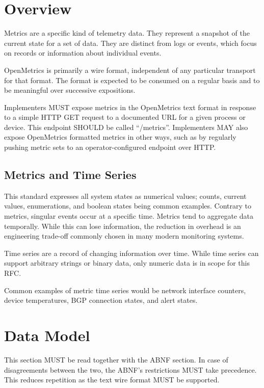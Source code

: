 \documentclass[a4paper,12pt,notitlepage,twoside,openright]{article}
\begin{document}
\hypertarget{overview}{%
\section{Overview}\label{overview}}

Metrics are a specific kind of telemetry data. They represent a snapshot
of the current state for a set of data. They are distinct from logs or
events, which focus on records or information about individual events.

OpenMetrics is primarily a wire format, independent of any particular
transport for that format. The format is expected to be consumed on a
regular basis and to be meaningful over successive expositions.

Implementers MUST expose metrics in the OpenMetrics text format in
response to a simple HTTP GET request to a documented URL for a given
process or device. This endpoint SHOULD be called ``/metrics''.
Implementers MAY also expose OpenMetrics formatted metrics in other
ways, such as by regularly pushing metric sets to an operator-configured
endpoint over HTTP.

\hypertarget{metrics-and-time-series}{%
\subsection{Metrics and Time Series}\label{metrics-and-time-series}}

This standard expresses all system states as numerical values; counts,
current values, enumerations, and boolean states being common examples.
Contrary to metrics, singular events occur at a specific time. Metrics
tend to aggregate data temporally. While this can lose information, the
reduction in overhead is an engineering trade-off commonly chosen in
many modern monitoring systems.

Time series are a record of changing information over time. While time
series can support arbitrary strings or binary data, only numeric data
is in scope for this RFC.

Common examples of metric time series would be network interface
counters, device temperatures, BGP connection states, and alert states.

\hypertarget{data-model}{%
\section{Data Model}\label{data-model}}

This section MUST be read together with the ABNF section. In case of
disagreements between the two, the ABNF's restrictions MUST take
precedence. This reduces repetition as the text wire format MUST be
supported.
\end{document}
